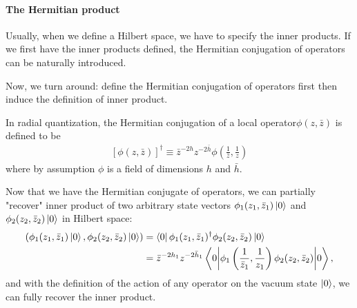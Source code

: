 \documentclass[10pt]{article}
\begin{document}
\paragraph{The Hermitian product}
Usually, when we define a Hilbert space, we have to specify the inner products.
If we first have the inner products defined, the Hermitian conjugation of operators can be naturally introduced.
\begin{intu}
    Now, we turn around: define the Hermitian conjugation of operators first then induce the definition of inner product\snm.
\end{intu}
\begin{definition}
    In radial quantization, the Hermitian conjugation of a local operator\snm $\phi(z,\bar{z})$ is defined to be
    \begin{align}
        \left[\phi(z,\bar{z})\right]^\dagger\equiv\bar{z}^{-2h}z^{-2\bar{h}}\phi\left(\frac{1}{\bar{z}},\frac{1}{z}\right)
    \end{align}
    where by assumption $\phi$ is a field of dimensions $h$ and $\bar{h}$.
\end{definition}
Now that we have the Hermitian conjugate of operators, we can partially "recover" inner product of two arbitrary state vectors $\phi_1(z_1,\bar{z}_1)\ket{0}$ and $\phi_2(z_2,\bar{z}_2)\ket{0}$ in Hilbert space:
\begin{align}
    (\phi_1(z_1,\bar{z}_1)\ket{0},\phi_2(z_2,\bar{z}_2)\ket{0}) & =\bra{0}\phi_1(z_1,\bar{z}_1)^\dagger\phi_2(z_2,\bar{z}_2)\ket{0}\notag                                             \\
                                                                & =\bar{z}^{-2h_1}z^{-2\bar{h}_1}\ev**{\phi_1\left(\frac{1}{\bar{z}_1},\frac{1}{z_1}\right)\phi_2(z_2,\bar{z}_2)}{0},
\end{align}
and with the definition of the action of any operator on the vacuum state $\ket{0}$, we can fully recover the inner product.
\end{document}
